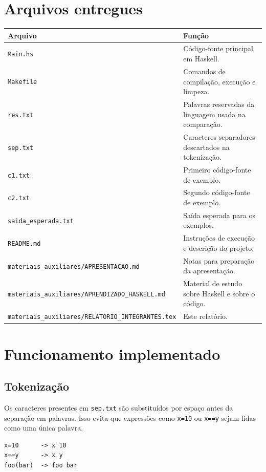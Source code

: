 \documentclass[12pt,a4paper]{article}
\newcommand{\arquivo}[1]{\texttt{#1}}
\begin{document}
\section{Arquivos entregues}

\begin{longtable}{p{5cm}p{9.5cm}}
\toprule
\textbf{Arquivo} & \textbf{Função} \\
\midrule
\endhead
\arquivo{Main.hs} & Código-fonte principal em Haskell. \\
\arquivo{Makefile} & Comandos de compilação, execução e limpeza. \\
\arquivo{res.txt} & Palavras reservadas da linguagem usada na comparação. \\
\arquivo{sep.txt} & Caracteres separadores descartados na tokenização. \\
\arquivo{c1.txt} & Primeiro código-fonte de exemplo. \\
\arquivo{c2.txt} & Segundo código-fonte de exemplo. \\
\arquivo{saida\_esperada.txt} & Saída esperada para os exemplos. \\
\arquivo{README.md} & Instruções de execução e descrição do projeto. \\
\arquivo{materiais\_auxiliares/APRESENTACAO.md} & Notas para preparação da apresentação. \\
\arquivo{materiais\_auxiliares/APRENDIZADO\_HASKELL.md} & Material de estudo sobre Haskell e sobre o código. \\
\arquivo{materiais\_auxiliares/RELATORIO\_INTEGRANTES.tex} & Este relatório. \\
\bottomrule
\end{longtable}

\section{Funcionamento implementado}

\subsection{Tokenização}

Os caracteres presentes em \arquivo{sep.txt} são substituídos por espaço antes da separação em palavras. Isso evita que expressões como \arquivo{x=10} ou \arquivo{x==y} sejam lidas como uma única palavra.

\begin{lstlisting}
x=10      -> x 10
x==y      -> x y
foo(bar)  -> foo bar
\end{lstlisting}
\end{document}
